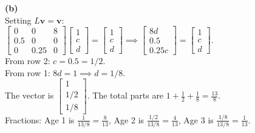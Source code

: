 \begin{solution}
\medskip
\textbf{(b)} \\
Setting $L\mathbf{v} = \mathbf{v}$: \\
$\begin{bmatrix} 0 & 0 & 8 \\ 0.5 & 0 & 0 \\ 0 & 0.25 & 0 \end{bmatrix} \begin{bmatrix} 1 \\ c \\ d \end{bmatrix} = \begin{bmatrix} 1 \\ c \\ d \end{bmatrix} \implies \begin{bmatrix} 8d \\ 0.5 \\ 0.25c \end{bmatrix} = \begin{bmatrix} 1 \\ c \\ d \end{bmatrix}$. \\
From row 2: $c = 0.5 = 1/2$. \\
From row 1: $8d = 1 \implies d = 1/8$. \\
The vector is $\begin{bmatrix} 1 \\ 1/2 \\ 1/8 \end{bmatrix}$. The total parts are $1 + \frac{1}{2} + \frac{1}{8} = \frac{13}{8}$. \\
Fractions: Age 1 is $\frac{1}{13/8} = \frac{8}{13}$, Age 2 is $\frac{1/2}{13/8} = \frac{4}{13}$, Age 3 is $\frac{1/8}{13/8} = \frac{1}{13}$.


\end{solution}
